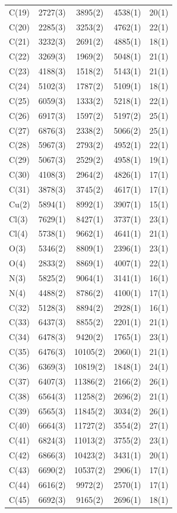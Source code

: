 \begin{center}
{\begin{supertabular}{lcccc}
C(19)&2727(3)&3895(2)&4538(1)&20(1)\\
C(20)&2285(3)&3253(2)&4762(1)&22(1)\\
C(21)&3232(3)&2691(2)&4885(1)&18(1)\\
C(22)&3269(3)&1969(2)&5048(1)&21(1)\\
C(23)&4188(3)&1518(2)&5143(1)&21(1)\\
C(24)&5102(3)&1787(2)&5109(1)&18(1)\\
C(25)&6059(3)&1333(2)&5218(1)&22(1)\\
C(26)&6917(3)&1597(2)&5197(2)&25(1)\\
C(27)&6876(3)&2338(2)&5066(2)&25(1)\\
C(28)&5967(3)&2793(2)&4952(1)&22(1)\\
C(29)&5067(3)&2529(2)&4958(1)&19(1)\\
C(30)&4108(3)&2964(2)&4826(1)&17(1)\\
C(31)&3878(3)&3745(2)&4617(1)&17(1)\\
Cu(2)&5894(1)&8992(1)&3907(1)&15(1)\\
Cl(3)&7629(1)&8427(1)&3737(1)&23(1)\\
Cl(4)&5738(1)&9662(1)&4641(1)&21(1)\\
O(3)&5346(2)&8809(1)&2396(1)&23(1)\\
O(4)&2833(2)&8869(1)&4007(1)&22(1)\\
N(3)&5825(2)&9064(1)&3141(1)&16(1)\\
N(4)&4488(2)&8786(2)&4100(1)&17(1)\\
C(32)&5128(3)&8894(2)&2928(1)&16(1)\\
C(33)&6437(3)&8855(2)&2201(1)&21(1)\\
C(34)&6478(3)&9420(2)&1765(1)&23(1)\\
C(35)&6476(3)&10105(2)&2060(1)&21(1)\\
C(36)&6369(3)&10819(2)&1848(1)&24(1)\\
C(37)&6407(3)&11386(2)&2166(2)&26(1)\\
C(38)&6564(3)&11258(2)&2696(2)&21(1)\\
C(39)&6565(3)&11845(2)&3034(2)&26(1)\\
C(40)&6664(3)&11727(2)&3554(2)&27(1)\\
C(41)&6824(3)&11013(2)&3755(2)&23(1)\\
C(42)&6866(3)&10423(2)&3431(1)&20(1)\\
C(43)&6690(2)&10537(2)&2906(1)&17(1)\\
C(44)&6616(2)&9972(2)&2570(1)&17(1)\\
C(45)&6692(3)&9165(2)&2696(1)&18(1)\\

\end{supertabular}}
\end{center}
